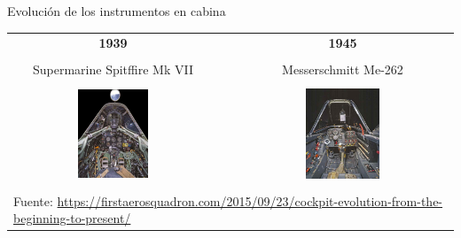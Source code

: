 \begin{frame}{Evoluci\'on de los instrumentos en cabina}
  
  \begin{tabular}{ccc}
    {\bf \large 1939} & & {\bf \large 1945} \\ & & \\
	{Supermarine Spitffire Mk VII} & & {Messerschmitt Me-262 } \\ & & \\
    \includegraphics[width=0.35\textwidth]{imagenes/1.1.introduccion/006-supermarine-spitfire-mk-vii.jpg}
	& \hspace{5mm}
	&\includegraphics[width=0.35\textwidth]{imagenes/1.1.introduccion/008-messerschmitt-me-262a-1a.jpg} \\ & & \\
	\multicolumn{3}{l}{
	{\tiny Fuente: \url{https://firstaerosquadron.com/2015/09/23/cockpit-evolution-from-the-beginning-to-present/}}
}
	\\
  \end{tabular}

\end{frame}


